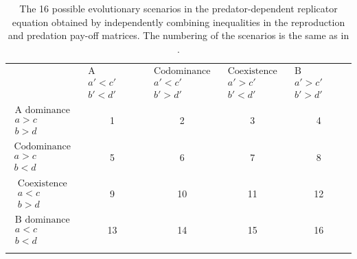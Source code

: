\documentclass[12pt]{article}
\theoremstyle{definition}
\begin{document}
\begin{table}     
	\begin{tabular}{ccccc}
		\hline\noalign{\smallskip}
		&$\begin{array}{c}
			\textrm{A dominance}\\
			a'<c'\\
			b'<d'
		\end{array}$&$\begin{array}{c}
			\textrm{Codominance}\\
			a'<c'\\
			b'>d'
		\end{array}$ &$\begin{array}{c}
			\textrm{Coexistence}\\
			a'>c'\\
			b'<d'
		\end{array}$ & $\begin{array}{c}
			\textrm{B dominance}\\
			a'>c'\\
			b'>d'
		\end{array}$ \\
		
		\noalign{\smallskip}\hline\noalign{\smallskip}
		$\begin{array}{c}
			\textrm{A dominance}\\
			a>c\\
			b>d
		\end{array}$ &1&2&3&4 \\
		\noalign{\smallskip}\hline
		$\begin{array}{c}
			\textrm{Codominance}\\
			a>c\\
			b<d
		\end{array}$ &5&6&7&8 \\
		\noalign{\smallskip}\hline
		$\begin{array}{c}
			\textrm{Coexistence}\\
			a<c\\
			b>d
		\end{array}$ &9&10&11&12 \\
		\noalign{\smallskip}\hline
		$\begin{array}{c}
			\textrm{B dominance}\\
			a<c\\
			b<d
		\end{array}$ &13&14&15&16 \\
		\noalign{\smallskip}\hline \smallskip
	\end{tabular}
	\caption{\label{tab:reppresce} The 16 possible evolutionary scenarios in the predator-dependent replicator equation obtained by independently combining inequalities in the reproduction and predation pay-off matrices. The numbering of the scenarios is the same as in \cite{bw}.}
\end{table}
\end{document}
